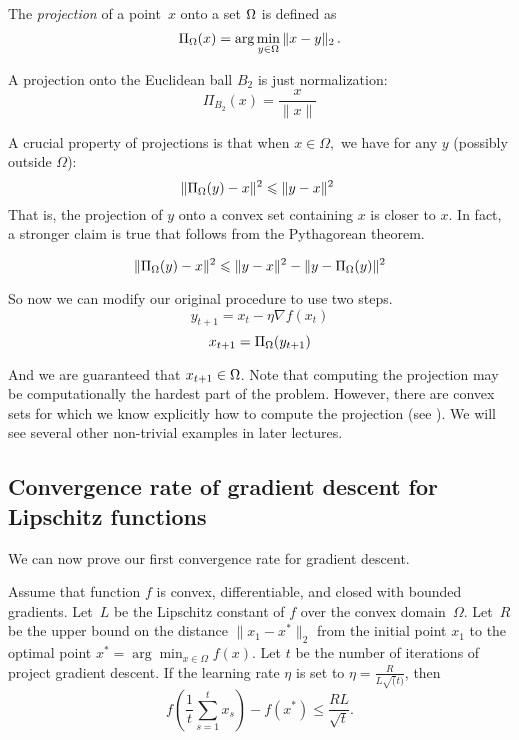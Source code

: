 \begin{definition}[Projection]
The \emph{projection} of a point~$x$ onto a set $\Omega$ is defined as
\[
\Pi_{\Omega}(x) = \arg\min_{y\in\Omega} \|x-y\|_2\,.
\]
\end{definition}

\begin{example}
A projection onto the Euclidean ball $B_2$ is just normalization:
\[
\Pi_{B_2}(x) = \dfrac{x}{\|x\|}
\]
\end{example}
%
A crucial property of projections is that when $x\in\Omega,$ we have for any $y$
(possibly outside $\Omega$):
\[
\| \Pi_{\Omega}(y) - x \|^2 \leqslant \| y - x \|^2\
\]
That is, the projection of $y$ onto a convex set containing $x$ is closer to
$x$. In fact, a stronger claim is true that follows from the
Pythagorean theorem.
%
\begin{lemma}
\[
\| \Pi_{\Omega}(y) - x \|^2 \leqslant \| y - x \|^2 - \| y - \Pi_{\Omega}(y) \|^2
\]
\end{lemma}


So now we can modify our original procedure to use two steps.
\[
y_{t+1} = x_t - \eta \nabla f(x_t)
\]
\[
x_{t+1} = \Pi_{\Omega}(y_{t+1})
\]

And we are guaranteed that $x_{t+1}\in\Omega$. Note that computing the
projection may be computationally the hardest part of the problem.
However, there are convex sets for which we know explicitly how to
compute the projection (see \exampleref{euclidean-ball}). We will see several
other non-trivial examples in later lectures.

\subsection{Convergence rate of gradient descent for Lipschitz functions}

We can now prove our first convergence rate for gradient descent.

\begin{theorem}
Assume that function $f$ is convex, differentiable, and closed with bounded
gradients. Let~$L$ be the Lipschitz constant of $f$ over the convex domain~$\Omega$. 
Let~$R$ be the upper bound on the distance $\lVert x_1 - x^* \rVert_2$
from the initial point $x_1$ to the optimal point $x^* = \arg\min_{x \in \Omega} f(x)$.
Let $t$ be the number of iterations of project gradient descent.
If the learning rate $\eta$ is set to $\eta=\frac{R}{L\sqrt(t)}$,
then $$f\left(\frac{1}{t}\sum_{s=1}^t x_s\right) - f\left(x^*\right) \leq
\frac{RL}{\sqrt{t}}.$$
\end{theorem}

